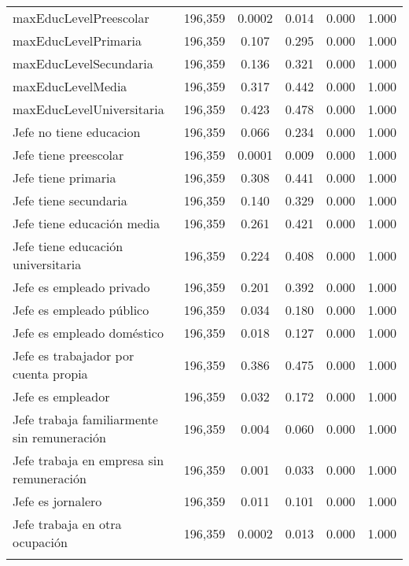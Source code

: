 \begin{table}[!htbp]
\begin{tabular}{@{\extracolsep{5pt}}lccccc}
maxEducLevelPreescolar & 196,359 & 0.0002 & 0.014 & 0.000 & 1.000 \\ 
maxEducLevelPrimaria & 196,359 & 0.107 & 0.295 & 0.000 & 1.000 \\ 
maxEducLevelSecundaria & 196,359 & 0.136 & 0.321 & 0.000 & 1.000 \\ 
maxEducLevelMedia & 196,359 & 0.317 & 0.442 & 0.000 & 1.000 \\ 
maxEducLevelUniversitaria & 196,359 & 0.423 & 0.478 & 0.000 & 1.000 \\ 
Jefe no tiene educacion & 196,359 & 0.066 & 0.234 & 0.000 & 1.000 \\ 
Jefe tiene preescolar & 196,359 & 0.0001 & 0.009 & 0.000 & 1.000 \\ 
Jefe tiene primaria & 196,359 & 0.308 & 0.441 & 0.000 & 1.000 \\ 
Jefe tiene secundaria & 196,359 & 0.140 & 0.329 & 0.000 & 1.000 \\ 
Jefe tiene educación media & 196,359 & 0.261 & 0.421 & 0.000 & 1.000 \\ 
Jefe tiene educación universitaria & 196,359 & 0.224 & 0.408 & 0.000 & 1.000 \\ 
Jefe es empleado privado & 196,359 & 0.201 & 0.392 & 0.000 & 1.000 \\ 
Jefe es empleado público & 196,359 & 0.034 & 0.180 & 0.000 & 1.000 \\ 
Jefe es empleado doméstico & 196,359 & 0.018 & 0.127 & 0.000 & 1.000 \\ 
Jefe es trabajador por cuenta propia & 196,359 & 0.386 & 0.475 & 0.000 & 1.000 \\ 
Jefe es empleador & 196,359 & 0.032 & 0.172 & 0.000 & 1.000 \\ 
Jefe trabaja familiarmente sin remuneración & 196,359 & 0.004 & 0.060 & 0.000 & 1.000 \\ 
Jefe trabaja en empresa sin remuneración & 196,359 & 0.001 & 0.033 & 0.000 & 1.000 \\ 
Jefe es jornalero & 196,359 & 0.011 & 0.101 & 0.000 & 1.000 \\ 
Jefe trabaja en otra ocupación & 196,359 & 0.0002 & 0.013 & 0.000 & 1.000 \\ 
\hline \\[-1.8ex] 
\end{tabular} 
\end{table} 